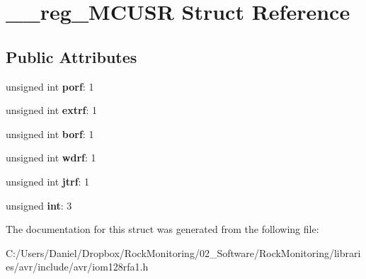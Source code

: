 \hypertarget{struct____reg___m_c_u_s_r}{}\section{\+\_\+\+\_\+reg\+\_\+\+M\+C\+U\+SR Struct Reference}
\label{struct____reg___m_c_u_s_r}
\subsection*{Public Attributes}
\begin{DoxyCompactItemize}
\item 
unsigned int {\bfseries porf}\+: 1\hypertarget{struct____reg___m_c_u_s_r_a417021addb57d06913fb6a66823b3d62}{}\label{struct____reg___m_c_u_s_r_a417021addb57d06913fb6a66823b3d62}

\item 
unsigned int {\bfseries extrf}\+: 1\hypertarget{struct____reg___m_c_u_s_r_a7feddacd9572d52ee8f0eacb1428e3ff}{}\label{struct____reg___m_c_u_s_r_a7feddacd9572d52ee8f0eacb1428e3ff}

\item 
unsigned int {\bfseries borf}\+: 1\hypertarget{struct____reg___m_c_u_s_r_abf464d2f0dd954681d81e1b786529a88}{}\label{struct____reg___m_c_u_s_r_abf464d2f0dd954681d81e1b786529a88}

\item 
unsigned int {\bfseries wdrf}\+: 1\hypertarget{struct____reg___m_c_u_s_r_ad2ce2856fe8c056d7d0dd0f11682106a}{}\label{struct____reg___m_c_u_s_r_ad2ce2856fe8c056d7d0dd0f11682106a}

\item 
unsigned int {\bfseries jtrf}\+: 1\hypertarget{struct____reg___m_c_u_s_r_afc38277058002de4132e6e8e1e10addb}{}\label{struct____reg___m_c_u_s_r_afc38277058002de4132e6e8e1e10addb}

\item 
unsigned {\bfseries int}\+: 3\hypertarget{struct____reg___m_c_u_s_r_a7a945db95f478e3f9e5367697f871136}{}\label{struct____reg___m_c_u_s_r_a7a945db95f478e3f9e5367697f871136}

\end{DoxyCompactItemize}


The documentation for this struct was generated from the following file\+:\begin{DoxyCompactItemize}
\item 
C\+:/\+Users/\+Daniel/\+Dropbox/\+Rock\+Monitoring/02\+\_\+\+Software/\+Rock\+Monitoring/libraries/avr/include/avr/iom128rfa1.\+h\end{DoxyCompactItemize}
